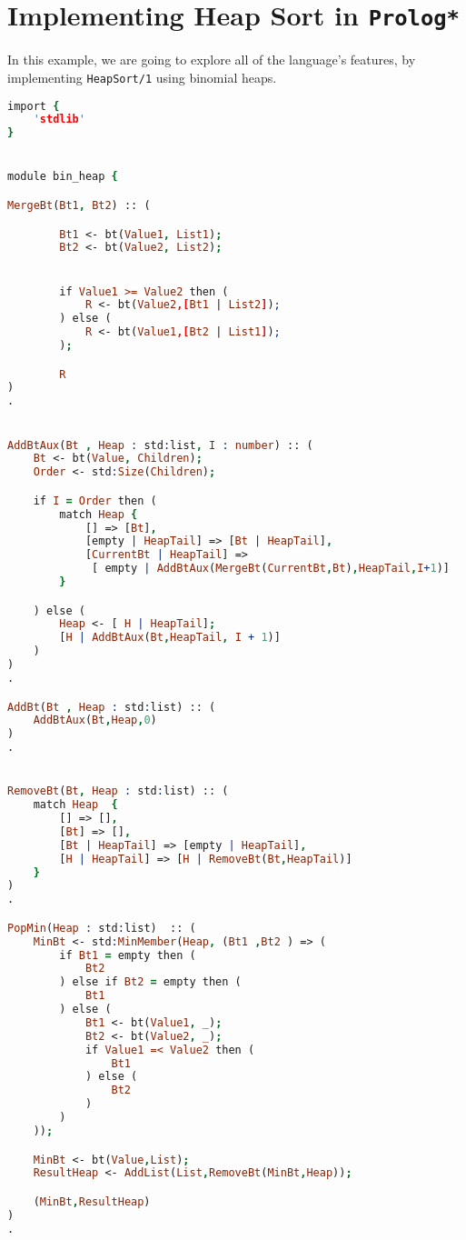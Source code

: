 \section{Implementing Heap Sort in \texttt{Prolog*}}

In this example, we are going to explore all of the language's features, by 
implementing \texttt{HeapSort/1} using binomial heaps.



\begin{lstlisting}[language = Prolog]
import {
    'stdlib'
}


module bin_heap {

MergeBt(Bt1, Bt2) :: (

        Bt1 <- bt(Value1, List1);
        Bt2 <- bt(Value2, List2);


        if Value1 >= Value2 then (
            R <- bt(Value2,[Bt1 | List2]);
        ) else (
            R <- bt(Value1,[Bt2 | List1]);
        );

        R
)
.


AddBtAux(Bt , Heap : std:list, I : number) :: (
    Bt <- bt(Value, Children);
    Order <- std:Size(Children);

    if I = Order then (
        match Heap {
            [] => [Bt],
            [empty | HeapTail] => [Bt | HeapTail],
            [CurrentBt | HeapTail] => 
             [ empty | AddBtAux(MergeBt(CurrentBt,Bt),HeapTail,I+1)]
        }

    ) else (
        Heap <- [ H | HeapTail];
        [H | AddBtAux(Bt,HeapTail, I + 1)]
    )
)
.

AddBt(Bt , Heap : std:list) :: (
    AddBtAux(Bt,Heap,0)
)
.


RemoveBt(Bt, Heap : std:list) :: (
    match Heap  {
        [] => [], 
        [Bt] => [],
        [Bt | HeapTail] => [empty | HeapTail],
        [H | HeapTail] => [H | RemoveBt(Bt,HeapTail)]
    }
)
.

PopMin(Heap : std:list)  :: (
    MinBt <- std:MinMember(Heap, (Bt1 ,Bt2 ) => (
        if Bt1 = empty then (
            Bt2
        ) else if Bt2 = empty then (
            Bt1
        ) else (
            Bt1 <- bt(Value1, _);
            Bt2 <- bt(Value2, _);
            if Value1 =< Value2 then (
                Bt1 
            ) else (
                Bt2
            )
        )
    ));

    MinBt <- bt(Value,List);
    ResultHeap <- AddList(List,RemoveBt(MinBt,Heap));

    (MinBt,ResultHeap)
)
.


\end{lstlisting}
